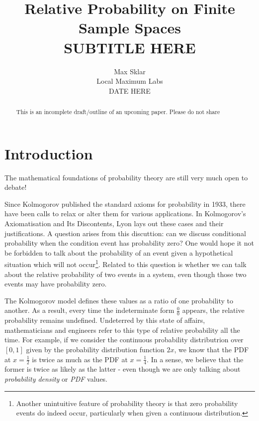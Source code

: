 \documentclass[twoside]{article}
\theoremstyle{plain}%
\theoremstyle{definition}
\theoremstyle{remark}
\begin{document}
\parindent=0in
\parskip=12pt


\title{
  Relative Probability on Finite Sample Spaces \\
  \large{
    SUBTITLE HERE
  }
}

\author{Max Sklar\\ Local Maximum Labs \\ DATE HERE}
\date{}

\maketitle
\thispagestyle{empty}

\begin{abstract}
This is an incomplete draft/outline of an upcoming paper. Please do not share
\end{abstract}

\tableofcontents
\newpage

\section{Introduction}

The mathematical foundations of probability theory are still very much open to debate!

Since Kolmogorov published the standard axioms for probability in 1933, there have been calls to relax or alter them for various applications. In Kolmogorov's Axiomatisation and Its Discontents\cite{lyon}, Lyon lays out these cases and their justifications. A question arises from this discuttion: can we discuss conditional probability when the condition event has probability zero? One would hope it not be forbidden to talk about the probability of an event given a hypothetical situation which will not occur\footnote{Another unintuitive feature of probability theory is that zero probability events do indeed occur, particularly when given a continuous distribution.}. Related to this question is whether we can talk about the relative probability of two events in a system, even though those two events may have probability zero.

The Kolmogorov model defines these values as a ratio of one probability to another. As a result, every time the indeterminate form \(\frac{0}{0}\) appears, the relative probability remains undefined. Undeterred by this state of affairs, mathematicians and engineers refer to this type of relative probability all the time. For example, if we consider the continuous probability distributrion over \([0, 1]\) given by the probability distribution function \(2x\), we know that the PDF at \(x = \frac{1}{2}\) is twice as much as the PDF at \(x = \frac{1}{4}\). In a sense, we believe that the former is twice as likely as the latter - even though we are only talking about \textit{probability density} or \textit{PDF} values.
\end{document}
